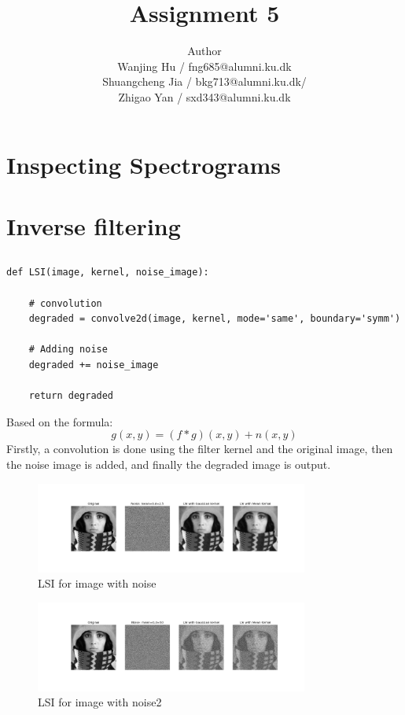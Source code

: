 \documentclass[12pt]{article}
\title{Assignment 5}
\author{Author \\
 Wanjing Hu / fng685@alumni.ku.dk  \\
 Shuangcheng Jia / bkg713@alumni.ku.dk/   \\
 Zhigao Yan / sxd343@alumni.ku.dk  \\
}
\begin{document}
\maketitle

\section{Inspecting Spectrograms}
\section{Inverse filtering}
\subsection{}
\begin{lstlisting}
def LSI(image, kernel, noise_image):

    # convolution
    degraded = convolve2d(image, kernel, mode='same', boundary='symm')
    
    # Adding noise
    degraded += noise_image

    return degraded
\end{lstlisting}
Based on the formula:
\[g(x,y) = (f*g)(x,y)+n(x,y)\]
Firstly, a convolution is done using the filter kernel and the original image, then the noise image is added, and finally the degraded image is output.

\begin{figure}[h]
    \centering
    \includegraphics[width=0.8\textwidth]{pics/a5_2.1_1.png} 
    \caption{LSI for image with noise}
\end{figure}
\begin{figure}[h]
    \centering
    \includegraphics[width=0.8\textwidth]{pics/a5_2.1_2.png} 
    \caption{LSI for image with noise2}
\end{figure}
\end{document}
